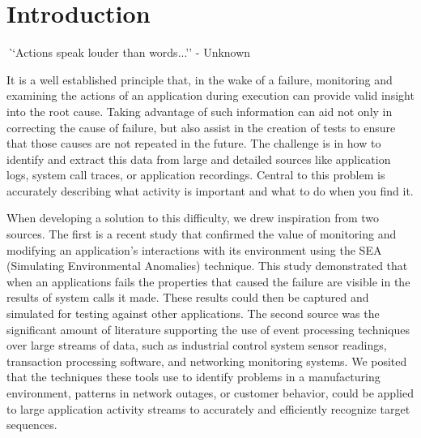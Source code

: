 \section{Introduction}
\label{SEC:introduction}


{\textit ``Actions speak louder than words...'' - Unknown}


It is a well established principle
that, in the wake of a failure,
monitoring and examining the actions
of an application
during execution can provide valid insight
into the root cause.
Taking advantage of such information
can aid not only in correcting
the cause of failure,
but also assist in the creation
of tests to ensure
that those causes
are not repeated in the future.
The challenge is in
how to identify and extract this data
from large and detailed sources like application logs,
system call traces,
or application recordings.
Central to this problem
is accurately describing what activity is important
and what to do when you find it.

When developing a solution to this difficulty, we drew inspiration from two sources. The
first is a recent study that confirmed the value of monitoring and
modifying an application’s interactions with its environment using the SEA (Simulating Environmental Anomalies) technique. This study demonstrated that when an applications fails the  properties
that caused the failure are visible in the results of system calls it made. These results could then
be captured and simulated for testing against other applications.  The
second source was the  significant amount of literature supporting the use of event
processing techniques over large streams of data, such as industrial
control system sensor readings, transaction processing software, and
networking monitoring systems. We posited that the techniques these tools
use to identify problems in a manufacturing environment, patterns in
network outages, or customer behavior, could be applied to large
application activity streams to accurately and efficiently recognize target
sequences.


